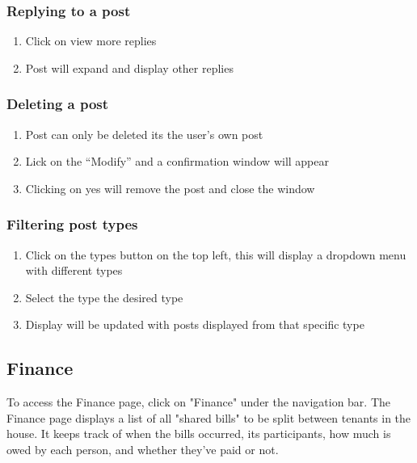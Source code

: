 \documentclass[12pt]{article}
\begin{document}
    \subsubsection{Replying to a post}
    \begin{enumerate}
        \item Click on view more replies
        \item Post will expand and display other replies
    \end{enumerate}
    
    \subsubsection{Deleting a post}
    \begin{enumerate}
        \item Post can only be deleted its the user's own post
        \item Lick on the ``Modify'' and a confirmation window will appear
        \item Clicking on yes will remove the post and close the window
    \end{enumerate}
    
    \subsubsection{Filtering post types}
    \begin{enumerate}
        \item Click on the types button on the top left, this will display a dropdown menu with different types
        \item Select the type the desired type
        \item Display will be updated with posts displayed from that specific type
    \end{enumerate}
    
    
    \subsection{Finance}
    To access the Finance page, click on "Finance" under the navigation bar. The Finance page displays a list of all "shared bills" to be split between tenants in the house. It keeps track of when the bills occurred, its participants, how much is owed by each person, and whether they've paid or not.
    
\end{document}

